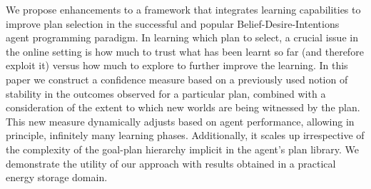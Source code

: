 
We propose enhancements to a framework that integrates
learning capabilities to improve plan selection in the successful and popular
Belief-Desire-Intentions agent programming paradigm.
%
In learning which plan to select, a 
crucial issue in the online setting is how much to trust what
has been learnt so far (and therefore exploit it) versus how much to
explore to further improve the learning.
%
In this paper we construct a confidence measure based on a previously 
used notion of stability in the outcomes observed for a particular plan, 
combined with a consideration of the extent to which new worlds are being 
witnessed by the plan.
%
This new measure dynamically adjusts based on agent performance, allowing in principle, infinitely many learning phases. Additionally, it scales up irrespective of the complexity of the goal-plan hierarchy implicit in the agent's plan library.
%
We demonstrate the utility of our approach with results obtained in a
practical energy storage domain.





